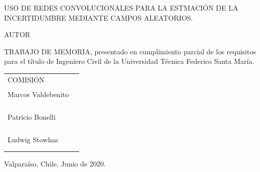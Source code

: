\documentclass[10pt,twoside,letterpaper]{phstylee}
\begin{document}
\noindent USO DE REDES CONVOLUCIONALES PARA LA ESTMACIÓN DE LA INCERTIDUMBRE MEDIANTE CAMPOS ALEATORIOS.

\vspace{5mm}


\vspace{25mm}

\noindent AUTOR

\vspace{5mm}


\vspace{20mm}

\noindent TRABAJO DE MEMORIA, presentado en cumplimiento parcial de
los requisitos para el título de Ingeniero Civil %
de la Universidad Técnica Federico Santa María.

\vspace{20mm}

\begin{tabular}{p{60mm}c}
COMISIÓN 
\vspace{2mm}
\\
Marcos Valdebenito & \rule{60mm}{1pt} \\
& \\
& \\
Patricio Bonelli & \rule{60mm}{1pt} \\
& \\
& \\
Ludwig Stowhas & \rule{60mm}{1pt} \\
&
\end{tabular}

\vspace{30.5mm}

\hfill Valparaíso, Chile, Junio de 2020.

\cleardoublepage



\end{document}
